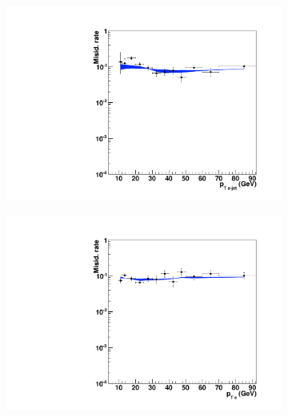 \begin{figure}
        \begin{subfigure}[b]{0.33\textwidth}
		\includegraphics[width=\textwidth]{4_Analisys/pics/8TeV/plots/fakerates/e_eet_subleading_kNN_electronJetPt.pdf}
                \caption{}
        \end{subfigure}%
        \begin{subfigure}[b]{0.33\textwidth}
                \includegraphics[width=\textwidth]{4_Analisys/pics/8TeV/plots/fakerates/e_eet_subleading_kNN_electronPt.pdf}
                \caption{}
        \end{subfigure}
        \begin{subfigure}[b]{0.33\textwidth}

\end{subfigure}
\end{figure}
